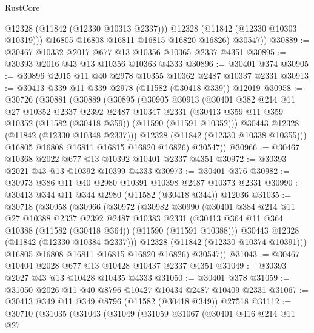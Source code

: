 \begin{lexlean}{RustCore}
\begin{coremodule}
              @12328
              (@11842 (@12330 @10313 @2337)))
            @12328
            (@11842 (@12330 @10303 @10319)))
          @16805
          @16808
          @16811
          @16815
          @16820
          @16826)
        @30547))
@30889 := @30467 @10332 @2017 @677 @13 @10356 @10365 @2337 @4351
@30895 := @30393 @2016 @43 @13 @10356 @10363 @4333
@30896 := @30401 @374
@30905 := @30896 @2015 @11 @40 @2978 @10355 @10362 @2487 @10337 @2331
@30913 := @30413 @339 @11 @339 @2978 (@11582 (@30418 @339)) @12019
@30958 := @30726
    (@30881
      (@30889
        (@30895
          (@30905
            @30913
            (@30401
              @382
              @214
              @11
              @27
              @10352
              @2337
              @2392
              @2487
              @10347
              @2331
              (@30413 @359 @11 @359 @10352 (@11582 (@30418 @359)) (@11590 (@11591 @10352)))
              @30443
              @12328
              (@11842 (@12330 @10348 @2337)))
            @12328
            (@11842 (@12330 @10338 @10355)))
          @16805
          @16808
          @16811
          @16815
          @16820
          @16826)
        @30547))
@30966 := @30467 @10368 @2022 @677 @13 @10392 @10401 @2337 @4351
@30972 := @30393 @2021 @43 @13 @10392 @10399 @4333
@30973 := @30401 @376
@30982 := @30973 @386 @11 @40 @2980 @10391 @10398 @2487 @10373 @2331
@30990 := @30413 @344 @11 @344 @2980 (@11582 (@30418 @344)) @12036
@31035 := @30718
    (@30958
      (@30966
        (@30972
          (@30982
            @30990
            (@30401
              @384
              @214
              @11
              @27
              @10388
              @2337
              @2392
              @2487
              @10383
              @2331
              (@30413 @364 @11 @364 @10388 (@11582 (@30418 @364)) (@11590 (@11591 @10388)))
              @30443
              @12328
              (@11842 (@12330 @10384 @2337)))
            @12328
            (@11842 (@12330 @10374 @10391)))
          @16805
          @16808
          @16811
          @16815
          @16820
          @16826)
        @30547))
@31043 := @30467 @10404 @2028 @677 @13 @10428 @10437 @2337 @4351
@31049 := @30393 @2027 @43 @13 @10428 @10435 @4333
@31050 := @30401 @378
@31059 := @31050 @2026 @11 @40 @8796 @10427 @10434 @2487 @10409 @2331
@31067 := @30413 @349 @11 @349 @8796 (@11582 (@30418 @349)) @27518
@31112 := @30710
    (@31035
      (@31043
        (@31049
          (@31059
            @31067
            (@30401
              @416
              @214
              @11
              @27

\end{coremodule}
\end{lexlean}
